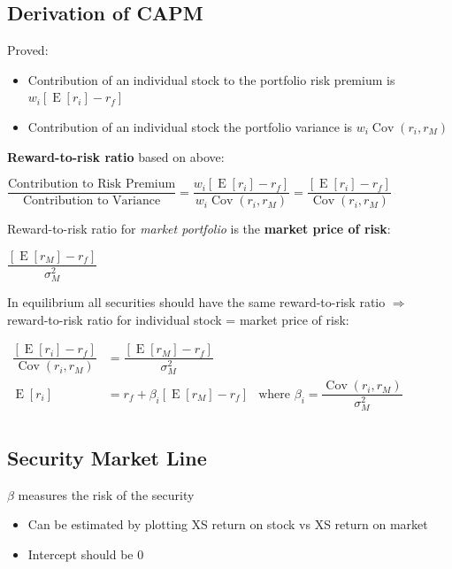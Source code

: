 \documentclass[]{book}
\providecommand{\tightlist}{%
  \setlength{\itemsep}{0pt}\setlength{\parskip}{0pt}}
\theoremstyle{definition}
\theoremstyle{definition}
\theoremstyle{remark}
\begin{document}
\subsection{Derivation of CAPM}\label{derivation-of-capm}

Proved:

\begin{itemize}
\item
  Contribution of an individual stock to the portfolio risk premium is
  \(w_i[\operatorname{E}[r_i]-r_f]\)
\item
  Contribution of an individual stock the portfolio variance is
  \(w_i \operatorname{Cov}(r_i, r_M)\)
\end{itemize}

\textbf{Reward-to-risk ratio} based on above:

\(\dfrac{\text{Contribution to Risk Premium}}{\text{Contribution to Variance}} = \dfrac{w_i[\operatorname{E}[r_i]-r_f]}{w_i \operatorname{Cov}(r_i, r_M)} = \dfrac{[\operatorname{E}[r_i]-r_f]}{\operatorname{Cov}(r_i, r_M)}\)

Reward-to-risk ratio for \emph{market portfolio} is the \textbf{market
price of risk}:

\(\dfrac{[\operatorname{E}[r_M]-r_f]}{\sigma^2_M}\)

In equilibrium all securities should have the same reward-to-risk ratio
\(\Rightarrow\) reward-to-risk ratio for individual stock = market price
of risk:

\(\begin{array}{ccc}  \dfrac{[\operatorname{E}[r_i]-r_f]}{\operatorname{Cov}(r_i, r_M)} &= \dfrac{[\operatorname{E}[r_M]-r_f]}{\sigma^2_M} \\  \operatorname{E}[r_i] &= r_f + \beta_i [\operatorname{E}[r_M] - r_f] &\text{where } \beta_i = \dfrac{\operatorname{Cov}(r_i, r_M)}{\sigma^2_M} \\ \end{array}\)

\subsection{Security Market Line}\label{security-market-line}

\(\beta\) measures the risk of the security

\begin{itemize}
\tightlist
\item
  Can be estimated by plotting XS return on stock vs XS return on market
\item
  Intercept should be 0
\end{itemize}
\end{document}
